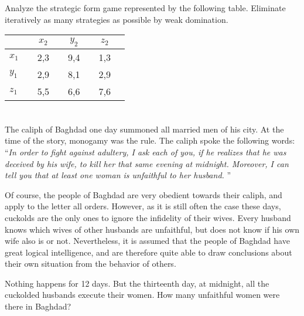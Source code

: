 \documentclass{../ape}
\begin{document}

\section{}
Analyze the strategic form game represented by the following table. Eliminate iteratively as many strategies as possible by weak domination.
\begin{center}
	\begin{tabular}[h!]{l|ccccccc}
		&& $x_2$ && $y_2$ && $z_2$ \\
		\hline
		$x_1$ && 2,3 && 9,4 && 1,3 & \\
		$y_1$ && 2,9 && 8,1 && 2,9 & \\
		$z_1$ && 5,5 && 6,6 && 7,6 &
	\end{tabular} 
\end{center}

\begin{solution}

\end{solution}

\section{}
The caliph of Baghdad one day summoned all married men of his city. At the time of the story, monogamy was the rule. The caliph spoke the following words: ``\textit{In order to fight against adultery, I ask each of you, if he realizes that he was deceived by his wife, to kill her that same evening at midnight. Moreover, I can tell you that at least one woman is unfaithful to her husband.} ''

Of course, the people of Baghdad are very obedient towards their caliph, and apply to the letter all orders. However, as it is still often the case these days, cuckolds are the only ones to ignore the infidelity of their wives. Every husband knows which wives of other husbands are unfaithful, but does not know if his own wife also is or not. Nevertheless, it is assumed that the people of Baghdad have great logical intelligence, and are therefore quite able to draw conclusions about their own situation from the behavior of others.

Nothing happens for 12 days. But the thirteenth day, at midnight, all the cuckolded husbands execute their women. How many unfaithful women were there in Baghdad?
\end{document}
